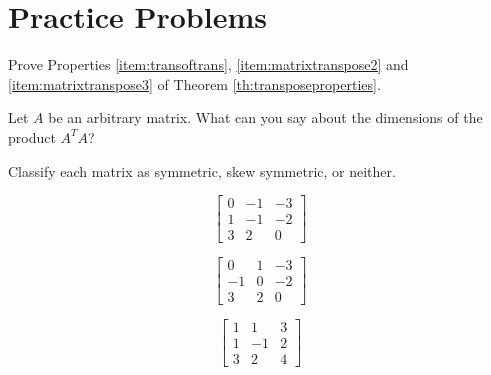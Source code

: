 \documentclass{ximera}
\begin{document}
\section*{Practice Problems}


\begin{problem} Prove Properties \ref{item:transoftrans}, \ref{item:matrixtranspose2} and \ref{item:matrixtranspose3} of Theorem \ref{th:transposeproperties}.
\end{problem}

\begin{problem} Let $A$ be an arbitrary matrix.  What can you say about the dimensions of the product $A^TA$?
\end{problem}

\begin{problem}
Classify each matrix as symmetric, skew symmetric, or neither.
\begin{problem}
$$\begin{bmatrix}
0 & -1 & -3\\
1 & -1 & -2\\
3 &  2 &  0
\end{bmatrix}$$
\begin{multipleChoice}
   \end{multipleChoice}
\end{problem}
\begin{problem}
$$\begin{bmatrix}
0 & 1 & -3\\
-1 & 0 & -2\\
3 &  2 &  0
\end{bmatrix}$$
\begin{multipleChoice}
   \end{multipleChoice}

\end{problem}
\begin{problem}
$$\begin{bmatrix}
1 & 1 & 3\\
1 & -1 & 2\\
3 &  2 &  4
\end{bmatrix}$$
\begin{multipleChoice}
   \end{multipleChoice}
\end{problem}
\end{problem}
\end{document}

